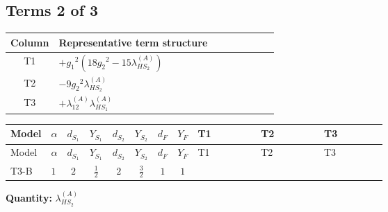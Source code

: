 \documentclass[8pt]{article}
\begin{document}
\begin{landscape}
\subsection*{Terms 2 of 3}
\begin{center}
\begin{tabular}{@{}c >{\raggedright\arraybackslash}p{0.82\linewidth}@{}}
\toprule
Column & Representative term structure \\
\midrule
T1 & \(\displaystyle +{g_1}^2 \left(18 {g_2}^2-15 {\lambda_{HS_2}^{(A)}}\right)\) \\
\midrule
T2 & \(\displaystyle -9 {g_2}^2 {\lambda_{HS_2}^{(A)}}\) \\
\midrule
T3 & \(\displaystyle +{\lambda_{12}^{(A)}} {\lambda_{HS_1}^{(A)}}\) \\
\midrule
\bottomrule
\end{tabular}
\end{center}
\smallskip
\tiny
\begin{longtable}{@{}llcccccc >{\raggedright\arraybackslash}p{0.21\linewidth} >{\raggedright\arraybackslash}p{0.21\linewidth} >{\raggedright\arraybackslash}p{0.21\linewidth}@{}}
\toprule
Model & $\alpha$ & $d_{S_1}$ & $Y_{S_1}$ & $d_{S_2}$ & $Y_{S_2}$ & $d_F$ & $Y_F$ & T1 & T2 & T3 \\
\midrule
\endfirsthead
\toprule
Model & $\alpha$ & $d_{S_1}$ & $Y_{S_1}$ & $d_{S_2}$ & $Y_{S_2}$ & $d_F$ & $Y_F$ & T1 & T2 & T3 \\
\midrule
\endhead
T3-B & $1$ & $2$ & $\frac{1}{2}$ & $2$ & $\frac{3}{2}$ & $1$ & $1$ & \scriptsize\adjustbox{max width=\linewidth}{$\begin{gathered} +{g_1}^2 \left(18 {g_2}^2-15 {\lambda_{HS_2}^{(A)}}\right)\end{gathered}$} & \scriptsize\adjustbox{max width=\linewidth}{$\begin{gathered} -9 {g_2}^2 {\lambda_{HS_2}^{(A)}}\end{gathered}$} & \scriptsize\adjustbox{max width=\linewidth}{$\begin{gathered} +{\lambda_{12}^{(A)}} {\lambda_{HS_1}^{(A)}}\end{gathered}$} \\
\midrule
\bottomrule
\end{longtable}
\clearpage
\noindent\textbf{Quantity: }$\lambda_{HS_2}^{(A)}$\par\smallskip

\end{landscape}
\end{document}
